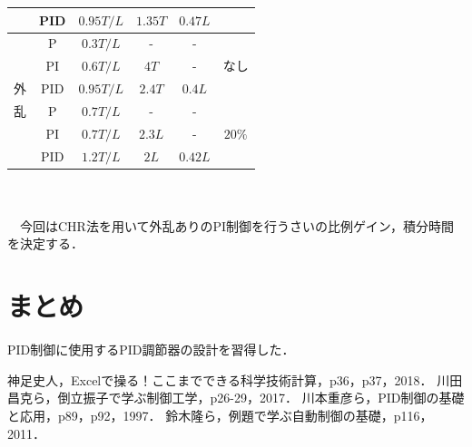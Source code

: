 \documentclass[12pt]{jsarticle}
\begin{document}
\begin{description}
\begin{table}[H]
\begin{center}
\begin{tabular}{|c|c|c|c|c|c|}
       & PID & $0.95T/L$ & $1.35T$ & $0.47L$ &\\ \hline
       & P & $0.3T/L$ & - & - & \\
       & PI & $0.6T/L$ & $4T$ & - & なし\\
       外 & PID & $0.95T/L$ & $2.4T$ & $0.4L$ &\\ \cline{2-6}
       乱 & P & $0.7T/L$ & - & - & \\
       & PI & $0.7T/L$ & $2.3L$ & - & $20\%$\\
       & PID & $1.2T/L$ & $2L$ & $0.42L$ &\\ \hline
    \end{tabular}
  \end{center}
\end{table}
\end{description}
\\
\\
\setcounter{page}{8}
　今回はCHR法を用いて外乱ありのPI制御を行うさいの比例ゲイン，積分時間を決定する．

\section{まとめ}
PID制御に使用するPID調節器の設計を習得した．

\begin{thebibliography}{9}
   神足史人，Excelで操る！ここまでできる科学技術計算，p36，p37，2018．
   川田昌克ら，倒立振子で学ぶ制御工学，p26-29，2017．
   川本重彦ら，PID制御の基礎と応用，p89，p92，1997．
   鈴木隆ら，例題で学ぶ自動制御の基礎，p116，2011．
\end{thebibliography}
\end{document}
